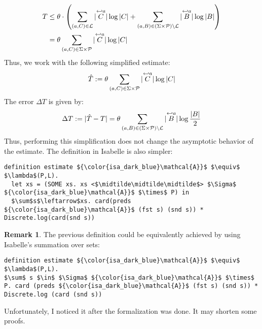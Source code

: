 \documentclass[12pt, a4 paper]{article}
\newcommand{\midtilde}{\raisebox{0.5ex}{\texttildelow}}
\theoremstyle{definition}
\newtheorem{remark}{Remark}
\begin{document}
\begin{align*}
    T & \leq \theta \cdot \left(\sum_{(a, C) \in \mathcal{L}} | \overset{\hookleftarrow {a}}{C} | \log | C | + \sum_{(a, B) \in (\Sigma\times \mathcal{P})\setminus \mathcal{L}} | \overset{\hookleftarrow {a}}{B} | \log | B | \right)\\
    & = \theta \sum_{(a, C) \in \Sigma\times \mathcal{P}} | \overset{\hookleftarrow {a}}{C} | \log | C |
\end{align*}
Thus, we work with the following simplified estimate:
\begin{equation}
    \hat{T} := \theta \sum_{(a, C) \in \Sigma\times \mathcal{P}} | \overset{\hookleftarrow {a}}{C} | \log | C |
\end{equation}
The error $\Delta T$ is given by:
\begin{equation}
    \Delta T := |\hat{T} - T| = \theta \sum_{(a, B) \in (\Sigma\times \mathcal{P})\setminus \mathcal{L}} | \overset{\hookleftarrow {a}}{B} | \log \frac{| B |}{2}
\end{equation}
Thus, performing this simplification does not change the asymptotic behavior of the estimate.
The definition in Isabelle is also simpler:
\begin{lstlisting}[language=Isabelle]
definition estimate ${\color{isa_dark_blue}\mathcal{A}}$ $\equiv$ $\lambda$(P,L).
  let xs = (SOME xs. xs <$\midtilde\midtilde\midtilde$> $\Sigma$ ${\color{isa_dark_blue}\mathcal{A}}$ $\times$ P) in
  $\sum$s$\leftarrow$xs. card(preds ${\color{isa_dark_blue}\mathcal{A}}$ (fst s) (snd s)) * Discrete.log(card(snd s))
\end{lstlisting}

\begin{remark}
The previous definition could be equivalently achieved by using Isabelle's summation over sets:
\begin{lstlisting}[language=Isabelle]
definition estimate ${\color{isa_dark_blue}\mathcal{A}}$ $\equiv$ $\lambda$(P,L).
$\sum$ s $\in$ $\Sigma$ ${\color{isa_dark_blue}\mathcal{A}}$ $\times$ P. card (preds ${\color{isa_dark_blue}\mathcal{A}}$ (fst s) (snd s)) * Discrete.log (card (snd s))
\end{lstlisting}
Unfortunately, I noticed it after the formalization was done. It may shorten some proofs.
\end{remark}
\end{document}
